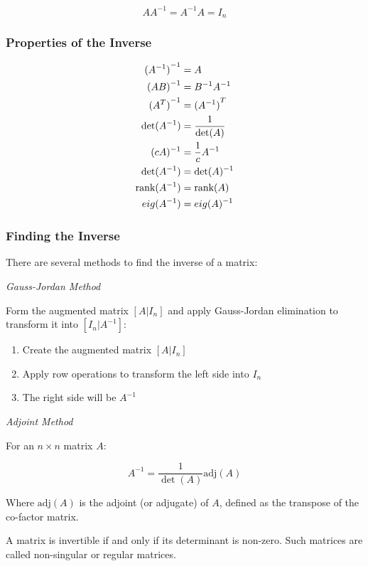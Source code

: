 \[
    A A^{-1} = A^{-1} A = I_n
\]

\subsubsection{Properties of the Inverse}

\begin{align*}
    {(A^{-1})}^{-1} &= A \\
    {(AB)}^{-1} &= B^{-1}A^{-1} \\
    {(A^T)}^{-1} &= {(A^{-1})}^T \\
    \det(A^{-1}) &= \frac{1}{\det(A)} \\
    (cA)^{-1} &= \frac{1}{c} A^{-1} \\
    \det(A^{-1}) &= \det(A)^{-1} \\
    \text{rank}(A^{-1}) &= \text{rank}(A) \\
    eig(A^{-1}) &= eig(A)^{-1}
\end{align*}

\subsubsection{Finding the Inverse}

There are several methods to find the inverse of a matrix:

\emph{Gauss-Jordan Method} 

Form the augmented matrix \([A|I_n]\) and apply Gauss-Jordan elimination to transform it into \([I_n|A^{-1}]\):

\begin{enumerate}

    \item Create the augmented matrix \([A|I_n]\)

    \item Apply row operations to transform the left side into \(I_n\)

    \item The right side will be \(A^{-1}\)

\end{enumerate}

\emph{Adjoint Method}

For an \(n \times n\) matrix \(A\):

\[
    A^{-1} = \frac{1}{\det(A)} \text{adj}(A)
\]

Where \(\text{adj}(A)\) is the adjoint (or adjugate) of \(A\), defined as the transpose of the co-factor matrix.

A matrix is invertible if and only if its determinant is non-zero. Such matrices are called non-singular or regular matrices.

